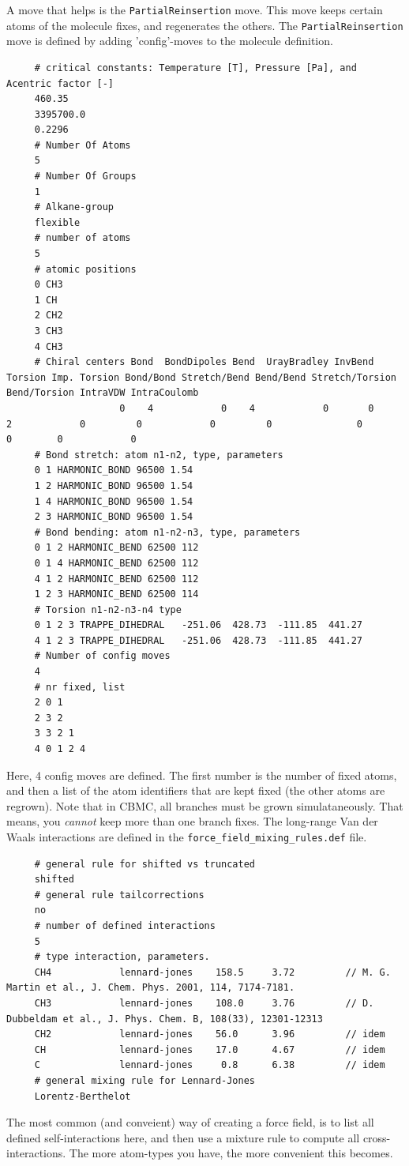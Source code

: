 A move that helps is the \verb+PartialReinsertion+ move. This move keeps certain atoms of the molecule fixes, and 
regenerates the others. The \verb+PartialReinsertion+ move is defined by adding 'config'-moves to the molecule definition.
\begin{tiny}
\begin{verbatim}
     # critical constants: Temperature [T], Pressure [Pa], and Acentric factor [-]
     460.35
     3395700.0
     0.2296
     # Number Of Atoms
     5
     # Number Of Groups
     1
     # Alkane-group
     flexible
     # number of atoms
     5
     # atomic positions
     0 CH3
     1 CH
     2 CH2
     3 CH3
     4 CH3
     # Chiral centers Bond  BondDipoles Bend  UrayBradley InvBend  Torsion Imp. Torsion Bond/Bond Stretch/Bend Bend/Bend Stretch/Torsion Bend/Torsion IntraVDW IntraCoulomb
                    0    4            0    4            0       0        2            0         0            0         0               0            0        0            0
     # Bond stretch: atom n1-n2, type, parameters
     0 1 HARMONIC_BOND 96500 1.54
     1 2 HARMONIC_BOND 96500 1.54
     1 4 HARMONIC_BOND 96500 1.54
     2 3 HARMONIC_BOND 96500 1.54
     # Bond bending: atom n1-n2-n3, type, parameters
     0 1 2 HARMONIC_BEND 62500 112
     0 1 4 HARMONIC_BEND 62500 112
     4 1 2 HARMONIC_BEND 62500 112
     1 2 3 HARMONIC_BEND 62500 114
     # Torsion n1-n2-n3-n4 type
     0 1 2 3 TRAPPE_DIHEDRAL   -251.06  428.73  -111.85  441.27
     4 1 2 3 TRAPPE_DIHEDRAL   -251.06  428.73  -111.85  441.27
     # Number of config moves
     4
     # nr fixed, list
     2 0 1
     2 3 2
     3 3 2 1
     4 0 1 2 4
\end{verbatim}
\end{tiny}
Here, 4 config moves are defined. The first number is the number of fixed atoms, and then a list of the atom identifiers that are kept fixed
(the other atoms are regrown). Note that in CBMC, all branches must be grown simulataneously. That means, you \emph{cannot} keep more than one branch fixes.
The long-range Van der Waals interactions are defined in the \verb+force_field_mixing_rules.def+ file.
\begin{tiny}
\begin{verbatim}
     # general rule for shifted vs truncated
     shifted
     # general rule tailcorrections
     no
     # number of defined interactions
     5
     # type interaction, parameters.
     CH4            lennard-jones    158.5     3.72         // M. G. Martin et al., J. Chem. Phys. 2001, 114, 7174-7181.
     CH3            lennard-jones    108.0     3.76         // D. Dubbeldam et al., J. Phys. Chem. B, 108(33), 12301-12313
     CH2            lennard-jones    56.0      3.96         // idem
     CH             lennard-jones    17.0      4.67         // idem
     C              lennard-jones     0.8      6.38         // idem
     # general mixing rule for Lennard-Jones
     Lorentz-Berthelot
\end{verbatim}
\end{tiny}
The most common (and conveient) way of creating a force field, is to list all defined self-interactions here, and then use a mixture rule to compute
all cross-interactions. The more atom-types you have, the more convenient this becomes.

